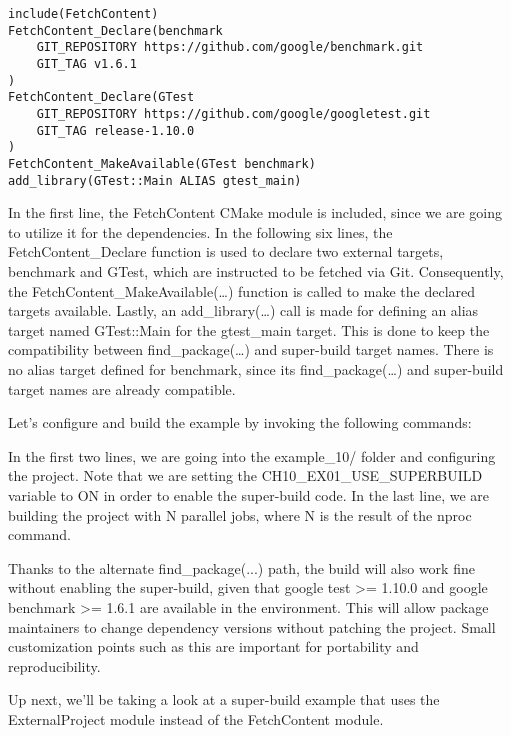 \begin{lstlisting}[style=styleCMake]
include(FetchContent)
FetchContent_Declare(benchmark
	GIT_REPOSITORY https://github.com/google/benchmark.git
	GIT_TAG v1.6.1
)
FetchContent_Declare(GTest
	GIT_REPOSITORY https://github.com/google/googletest.git
	GIT_TAG release-1.10.0
)
FetchContent_MakeAvailable(GTest benchmark)
add_library(GTest::Main ALIAS gtest_main)
\end{lstlisting}

In the first line, the FetchContent CMake module is included, since we are going to utilize it for the dependencies. In the following six lines, the FetchContent\_Declare function is used to declare two external targets, benchmark and GTest, which are instructed to be fetched via Git. Consequently, the FetchContent\_MakeAvailable(…) function is called to make the declared targets available. Lastly, an add\_library(…) call is made for defining an alias target named GTest::Main for the gtest\_main target. This is done to keep the compatibility between find\_package(…) and super-build target names. There is no alias target defined for benchmark, since its find\_package(…) and super-build target names are already compatible.

Let's configure and build the example by invoking the following commands:


In the first two lines, we are going into the example\_10/ folder and configuring the project. Note that we are setting the CH10\_EX01\_USE\_SUPERBUILD variable to ON in order to enable the super-build code. In the last line, we are building the project with N parallel jobs, where N is the result of the nproc command.
 
Thanks to the alternate find\_package(...) path, the build will also work fine without enabling the super-build, given that google test >= 1.10.0 and google benchmark >= 1.6.1 are available in the environment. This will allow package maintainers to change dependency versions without patching the project. Small customization points such as this are important for portability and reproducibility.

Up next, we'll be taking a look at a super-build example that uses the ExternalProject module instead of the FetchContent module.



























